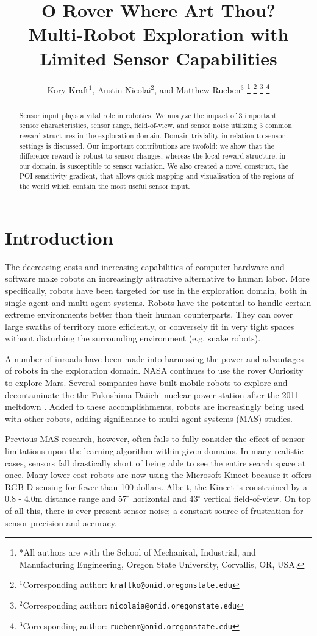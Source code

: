 \documentclass[letterpaper, 10 pt, conference]{ieeeconf}  %
\title{\LARGE \bf 
O Rover Where Art Thou?\\
Multi-Robot Exploration with Limited Sensor Capabilities
}
\author{Kory Kraft$^{1}$, Austin Nicolai$^{2}$, and Matthew Rueben$^{3}$%
\thanks{*All authors are with the School of Mechanical, Industrial, and Manufacturing Engineering,
         Oregon State University,
         Corvallis, OR, USA. }%
\thanks{$^{1}$Corresponding author: {\tt\small kraftko@onid.oregonstate.edu}}%
\thanks{$^{2}$Corresponding author: {\tt\small nicolaia@onid.oregonstate.edu}}%
\thanks{$^{3}$Corresponding author: {\tt\small ruebenm@onid.oregonstate.edu}}%
}
\begin{document}
\maketitle
\thispagestyle{empty}
\pagestyle{empty}

\begin{abstract}
Sensor input plays a vital role in robotics.
We analyze the impact of 3 important sensor characteristics, sensor range,
field-of-view, and sensor noise utilizing 3 common reward structures in the 
exploration domain. Domain triviality in relation to sensor settings is discussed.
Our important contributions are twofold: we show that the 
difference reward is robust to sensor changes, whereas 
the local reward structure, in our domain, is susceptible to sensor variation.
We also created a novel construct, the POI sensitivity gradient, that allows
quick mapping and vizualisation of the regions of the world which
contain the most useful sensor input.  
\end{abstract}


\section{Introduction}
The decreasing costs and increasing capabilities of computer hardware and software make
robots an increasingly attractive alternative to human labor. More specifically, robots have 
been targeted for use in the exploration domain, both in single agent and 
multi-agent systems.  Robots have the potential to
handle certain extreme environments better than their human
counterparts.  They can cover large swaths of territory more
efficiently, or conversely fit in very tight spaces without disturbing
the surrounding environment (e.g. snake robots). 

A number of inroads have been made into harnessing the power and
advantages of robots in the exploration domain. NASA continues to use
the rover Curiosity to explore Mars. Several companies have built
mobile robots to explore and decontaminate the the Fukushima Daiichi
nuclear power station after the 2011 meltdown \cite{nuclear_robots}. Added to these
accomplishments, robots are increasingly being used with other robots, 
adding significance to multi-agent systems (MAS) studies.

Previous MAS research, however, often fails to fully consider the effect of
sensor limitations upon the learning algorithm within given domains. In many realistic cases, sensors fall drastically short of being able to see the entire search space at once. Many lower-cost robots are now using the Microsoft Kinect because it offers RGB-D sensing for fewer than 100 dollars. Albeit, the Kinect is constrained by a 0.8 - 4.0m distance range and 57$^{\circ}$ horizontal and 43$^{\circ}$ vertical field-of-view. On top of all this, there is ever present sensor noise; a constant source of frustration for sensor precision and accuracy.
\end{document}
